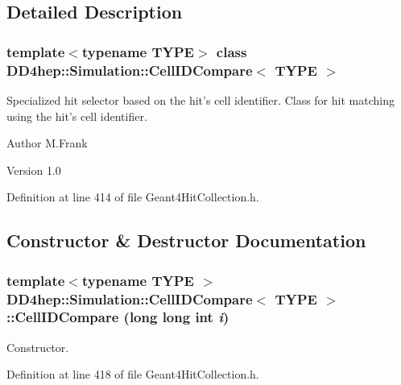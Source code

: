 \subsection{Detailed Description}
\subsubsection*{template$<$typename TYPE$>$ class DD4hep::Simulation::CellIDCompare$<$ TYPE $>$}

Specialized hit selector based on the hit's cell identifier. Class for hit matching using the hit's cell identifier.

\begin{DoxyAuthor}{Author}
M.Frank 
\end{DoxyAuthor}
\begin{DoxyVersion}{Version}
1.0 
\end{DoxyVersion}


Definition at line 414 of file Geant4HitCollection.h.

\subsection{Constructor \& Destructor Documentation}
\hypertarget{class_d_d4hep_1_1_simulation_1_1_cell_i_d_compare_ad644f00808767564625f5ef98303bf0c}{
\subsubsection[{CellIDCompare}]{\setlength{\rightskip}{0pt plus 5cm}template$<$typename TYPE $>$ {\bf DD4hep::Simulation::CellIDCompare}$<$ TYPE $>$::{\bf CellIDCompare} (long long int {\em i})}}
\label{class_d_d4hep_1_1_simulation_1_1_cell_i_d_compare_ad644f00808767564625f5ef98303bf0c}


Constructor. 

Definition at line 418 of file Geant4HitCollection.h.

